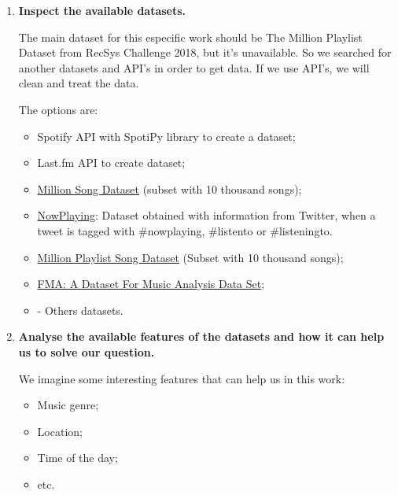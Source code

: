 \documentclass{article}
\begin{document}
    \begin{enumerate}
        \item \textbf{Inspect the available datasets.}
        
            The main dataset for this especific work should be The Million
            Playlist Dataset from RecSys Challenge 2018, but it's unavailable.
            So we searched for another datasets and API's in order to get data.
            If we use API's, we will clean and treat the data.
        
            The options are:

            \begin{itemize}
                \item Spotify API with SpotiPy library to create a dataset;
                \item Last.fm API to create dataset;
                \item \href{http://millionsongdataset.com/}{Million Song Dataset}
                (subset with 10 thousand songs);
                \item \href{https://dbis.uibk.ac.at/node/263}{NowPlaying}:
                Dataset obtained with information from Twitter, when a tweet is tagged with \#nowplaying, \#listento or \#listeningto.
                \item \href{https://github.com/felipevieira/computacao-e-musica-lsd/blob/master/sbcm-2017/Datasets/MPSD%20v1.0.csv}{Million Playlist Song Dataset}
                (Subset with 10 thousand songs);
                \item \href{https://github.com/mdeff/fma}{FMA:
                A Dataset For Music Analysis Data Set};
                \item - Others datasets.
            \end{itemize}

        \item \textbf{Analyse the available features of the datasets and how it
        can help us to solve our question.}
        
            We imagine some interesting features that can help us in this work:

            \begin{itemize}
                \item Music genre;
                \item Location;
                \item Time of the day;
                \item etc.
            \end{itemize}


\end{enumerate}
\end{document}
